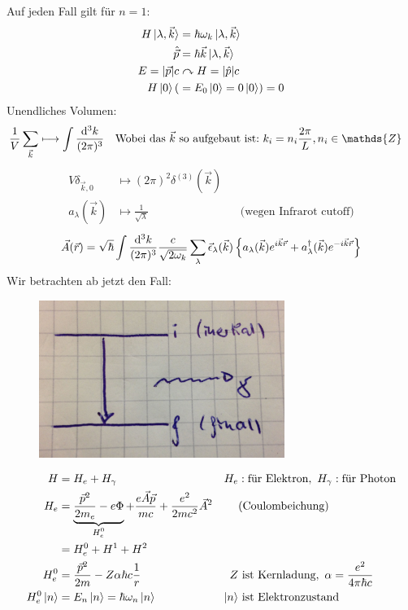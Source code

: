 		Auf jeden Fall gilt für $n=1$:
		\begin{align*}
		H \ket{\lambda, \vec{k}} &= \hbar \omega_k \ket{\lambda , \vec{k}} \\
		\hat{\vec{p}} &= \hbar \vec{k} \ket{\lambda , \vec{k}} \\
		E = |\vec{p}| c &\curvearrowright H = |\hat{p}| c \\
		H \ket{0} (&= E_0 \ket{0} = 0 \ket{0} ) = 0
		\end{align*}
		Unendliches Volumen: 
		\begin{align*}
		\frac{1}{V} \sum_{\vec{k}} &\longmapsto \int \frac{\diff^3 k}{(2 \pi)^3}
		& \text{Wobei das~} \vec{k} \text{~so aufgebaut ist:~}k_i &= n_i \frac{2 \pi}{L}, n_i \in \mathds{Z}
		\end{align*} 
		\begin{align*}
		V \delta_{\vec{k} , 0} &\longmapsto (2 \pi)^2 \delta^{(3)} (\vec{k}) \\
		a_\lambda (\vec{k}) &\longmapsto \frac{1}{\sqrt{\lambda}} 
		& &\text{(wegen Infrarot cutoff)}
		\end{align*} 
		\begin{align*}
		\vec{A} (\vec{r}) =
		\sqrt{\hbar} \int \frac{\mathrm{d}^3 k}{(2 \pi)^3} \frac{c}{\sqrt{2 \omega_k}}
		\sum_\lambda \vec{\epsilon}_\lambda (\vec{k})
		\left\{ a_\lambda (\vec{k}) e^{i \vec{k} \vec{r}}
		+ a^\dagger_\lambda (\vec{k}) e^{-i \vec{k} \vec{r}}
		\right\}
		\end{align*}
		Wir betrachten ab jetzt den Fall: 
		\begin{figure} [ht]
			\begin{center}
				\includegraphics[width=8cm]{Bild2.jpg}
			\end{center}
		\end{figure}
		\begin{align*}
		H &= H_e + H_\gamma & H_e &: \text{für Elektron}, ~ H_\gamma : \text{für Photon} \\
		H_e &= \underbrace{\frac{\vec{p}^2}{2 m_e} - e \Phi}_{\mathclap{H_e^0}}
		+ \frac{e \vec{A} \vec{p}}{m c}
		+ \frac{e^2}{2 m c^2} \vec{A}^2 &
		&\text{(Coulombeichung)}\\
		&= H_e^0 + H^1 + H^2 \\
		H_e^0 &= \frac{\vec{p}^2}{2 m} - Z \alpha \hbar c \frac{1}{r} & 
		Z &~\text{ist Kernladung},~ \alpha = \frac{e^2}{4 \pi \hbar c}\\
		H_e^0 \ket{n} &= E_n \ket{n} = \hbar \omega_n \ket{n} & 
		\ket{n} &~ \text{ist Elektronzustand}
		\end{align*}	
